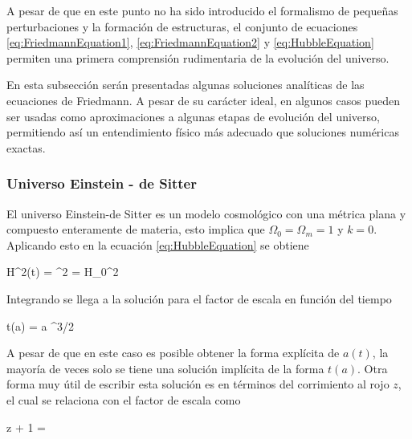 A pesar de que en este punto no ha sido introducido el formalismo de 
pequeñas perturbaciones y la formación de estructuras, el conjunto de 
ecuaciones \ref{eq:FriedmannEquation1}, \ref{eq:FriedmannEquation2} y 
\ref{eq:HubbleEquation} permiten una primera comprensión rudimentaria de 
la evolución del universo.


En esta subsección serán presentadas algunas soluciones analíticas de las 
ecuaciones de Friedmann. A pesar de su carácter ideal, en algunos casos
pueden ser usadas como aproximaciones a algunas etapas de evolución del 
universo, permitiendo así un entendimiento físico más adecuado que 
soluciones numéricas exactas.


			\subsubsection*{Universo Einstein - de Sitter}


El universo Einstein-de Sitter es un modelo cosmológico con una métrica 
plana y compuesto enteramente de materia, esto implica que 
$\Omega_0 = \Omega_m = 1$ y $k=0$. Aplicando esto en la ecuación 
\ref{eq:HubbleEquation} se obtiene


{ H^2(t) = ^2 = H_0^2  }


Integrando se llega a la solución para el factor de escala en función del 
tiempo


{ t(a) =  a ^{3/2} }


A pesar de que en este caso es posible obtener la forma explícita de $a(t)$,
la mayoría de veces solo se tiene una solución implícita de la forma $t(a)$.
Otra forma muy útil de escribir esta solución es en términos del corrimiento
al rojo $z$, el cual se relaciona con el factor de escala como 
\cite{longair2008}


{ z + 1 =  }



